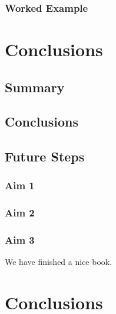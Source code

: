 \documentclass[]{book}
\theoremstyle{definition}
\theoremstyle{definition}
\theoremstyle{remark}
\begin{document}
\subsection{Worked Example}\label{worked-example}

\chapter{Conclusions}\label{conclusions}

\section{Summary}\label{summary}

\section{Conclusions}\label{conclusions-1}

\section{Future Steps}\label{future-steps}

\subsection{Aim 1}\label{aim-1}

\subsection{Aim 2}\label{aim-2}

\subsection{Aim 3}\label{aim-3}

We have finished a nice book.

\chapter*{Conclusions}\label{conclusions-2}


\end{document}
